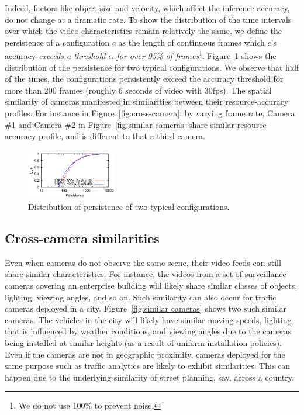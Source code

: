 Indeed, factors like object size and velocity,
which affect the inference accuracy, do not change at a dramatic rate. To show the distribution of the time intervals over which the video characteristics remain relatively the same, we define the persistence of a configuration $c$ as the length of continuous frames which $c$'s accuracy {\em exceeds a threshold $\alpha$ for over 95\% of frames}\footnote{We do not use 100\% to prevent noise.}. Figure~\ref{fig:persistence} shows the distribution of the persistence for two typical configurations. We observe that half of the times, the configurations persistently exceed the accuracy threshold for more than 200 frames (roughly 6 seconds of video with 30fps).
The spatial similarity of cameras manifested in similarities between their resource-accuracy profiles. For instance in Figure~\ref{fig:cross-camera}, by varying frame rate, Camera \#1 and Camera \#2 in Figure~\ref{fig:similar cameras} share similar resource-accuracy profile, and is different to that a third camera.

\begin{figure}
    \centering
    \includegraphics[width=0.35\textwidth]{PaperGraphs/PersistenceCDF.pdf}
    \caption{Distribution of persistence of two typical configurations. }
    \label{fig:persistence}
\end{figure}


\subsection{Cross-camera similarities}
\label{subsec:spatial}

Even when cameras do not observe the same scene, 
their video feeds can still share similar characteristics. For instance, the videos from a set of surveillance cameras covering an enterprise building will likely share similar classes of objects, lighting, viewing angles, and so on. 
Such similarity can also occur for traffic cameras deployed in a city.
Figure~\ref{fig:similar cameras} shows two such similar cameras.
The vehicles in the city will likely have similar moving speeds, lighting that is influenced by weather conditions, and viewing angles due to the cameras being installed at similar heights (as a result of  uniform installation policies). Even if the cameras are not in geographic proximity, cameras deployed for the same purpose such as traffic analytics are likely to exhibit similarities. This can happen due to the underlying similarity of street planning, say, across a country. 

